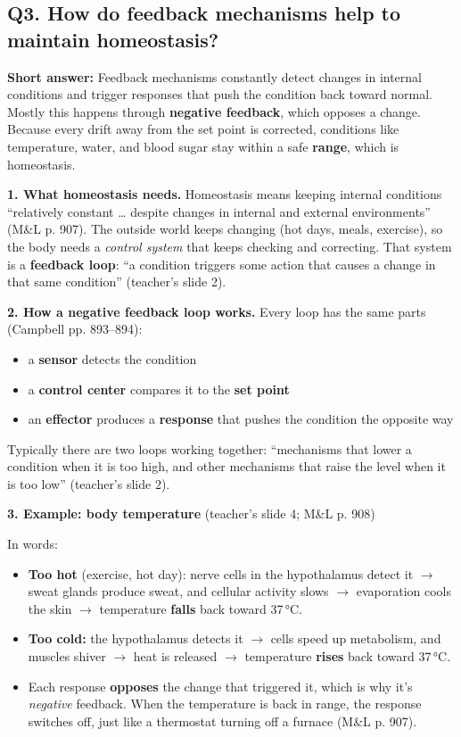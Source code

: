 \documentclass[11pt,letterpaper]{article}
\begin{document}
\subsection{Q3. How do feedback mechanisms help to maintain homeostasis?}

\textbf{Short answer:} Feedback mechanisms constantly detect changes in internal conditions and trigger responses that push the condition back toward normal. Mostly this happens through \textbf{negative feedback}, which opposes a change. Because every drift away from the set point is corrected, conditions like temperature, water, and blood sugar stay within a safe \textbf{range}, which is homeostasis.

\textbf{1. What homeostasis needs.} Homeostasis means keeping internal conditions ``relatively constant \dots{} despite changes in internal and external environments'' (M\&L p. 907). The outside world keeps changing (hot days, meals, exercise), so the body needs a \emph{control system} that keeps checking and correcting. That system is a \textbf{feedback loop}: ``a condition triggers some action that causes a change in that same condition'' (teacher's slide 2).

\textbf{2. How a negative feedback loop works.} Every loop has the same parts (Campbell pp. 893–894):
\begin{itemize}
  \item a \textbf{sensor} detects the condition
  \item a \textbf{control center} compares it to the \textbf{set point}
  \item an \textbf{effector} produces a \textbf{response} that pushes the condition the opposite way
\end{itemize}

Typically there are two loops working together: ``mechanisms that lower a condition when it is too high, and other mechanisms that raise the level when it is too low'' (teacher's slide 2).

\textbf{3. Example: body temperature} (teacher's slide 4; M\&L p. 908)


In words:
\begin{itemize}
  \item \textbf{Too hot} (exercise, hot day): nerve cells in the hypothalamus detect it $\rightarrow$ sweat glands produce sweat, and cellular activity slows $\rightarrow$ evaporation cools the skin $\rightarrow$ temperature \textbf{falls} back toward 37\,°C.
  \item \textbf{Too cold:} the hypothalamus detects it $\rightarrow$ cells speed up metabolism, and muscles shiver $\rightarrow$ heat is released $\rightarrow$ temperature \textbf{rises} back toward 37\,°C.
  \item Each response \textbf{opposes} the change that triggered it, which is why it's \emph{negative} feedback. When the temperature is back in range, the response switches off, just like a thermostat turning off a furnace (M\&L p. 907).
\end{itemize}
\end{document}
